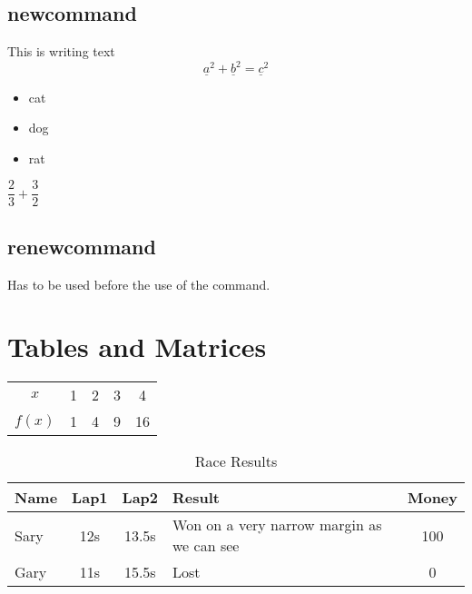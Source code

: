 \documentclass[12pt]{article}  %
\begin{document}
	\subsection{newcommand}



\newcommand{\txt}[1]{This is writing text}

\newcommand{\vc}[1]{\underline{#1}}

\newcommand{\beg}{\begin{itemize}}
\newcommand{\cls}{\end{itemize}}



\txt\\
$$\vc{a}^2 + \vc{b}^2 = \vc{c}^2$$
\beg
\item cat
\item dog
\item rat
\cls


\newcommand{\newfrac}[2]{\dfrac{#1}{#2} + \dfrac{#2}{#1}}

$\newfrac{2}{3}$


	\subsection{renewcommand}


Has to be used before the use of the command.

\section{Tables and Matrices}

\begin{tabular}{|c|c|c|c|c|}
\hline
$x$ & 1 & 2 & 3 & 4 \\
$f(x)$ & 1 & 4 & 9 & 16 \\ 
\end{tabular}




\begin{table}[h]

\begin{tabular}{|l|c|c|p{5cm}|c|}
\hline
Name & Lap1 & Lap2  & Result & Money \\ \hline  \hline
Sary & 12s & 13.5s & Won on a very narrow margin as we can see & 100 \\ \hline 
Gary & 11s & 15.5s & Lost & 0\\ \hline
\end{tabular}
\renewcommand{\tablename}{Table 4.1}

\caption{Race Results}
\label{tab:rce rslts}
\end{table}	
\end{document}
